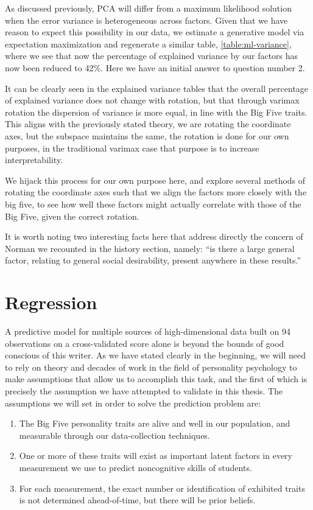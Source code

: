 \documentclass[a4paper,12pt]{article}
\begin{document}
As discussed previously, PCA will differ from a maximum likelihood solution when the error variance is heterogeneous across factors. Given that we have reason to expect this possibility in our data, we estimate a generative model via expectation maximization and regenerate a similar table, \ref{table:ml-variance}, where we see that now the percentage of explained variance by our factors has now been reduced to 42\%. Here we have an initial answer to question number 2.

It can be clearly seen in the explained variance tables that the overall percentage of explained variance does not change with rotation, but that through varimax rotation the dispersion of variance is more equal, in line with the Big Five traits. This aligns with the previously stated theory, we are rotating the coordinate axes, but the subspace maintains the same, the rotation is done for our own purposes, in the traditional varimax case that purpose is to increase interpretability.

We hijack this process for our own purpose here, and explore several methods of rotating the coordinate axes such that we align the factors more closely with the big five, to see how well these factors might actually correlate with those of the Big Five, given the correct rotation.


It is worth noting two interesting facts here that address directly the concern of Norman we recounted in the history section, namely: ``is there a large general factor, relating to general social desirability, present anywhere in these results.''
\section{Regression}

A predictive model for multiple sources of high-dimensional data built on 94 observations on a cross-validated score alone is beyond the bounds of good conscious of this writer. As we have stated clearly in the beginning, we will need to rely on theory and decades of work in the field of personality psychology to make assumptions that allow us to accomplish this task, and the first of which is precisely the assumption we have attempted to validate in this thesis. The assumptions we will set in order to solve the prediction problem are:


\begin{enumerate}
\item The Big Five personality traits are alive and well in our population, and measurable through our data-collection techniques.

\item One or more of these traits will exist as important latent factors in every measurement we use to predict noncognitive skills of students.

\item For each measurement, the exact number or identification of exhibited traits is not determined ahead-of-time, but there will be prior beliefs.
\end{enumerate}
\end{document}
